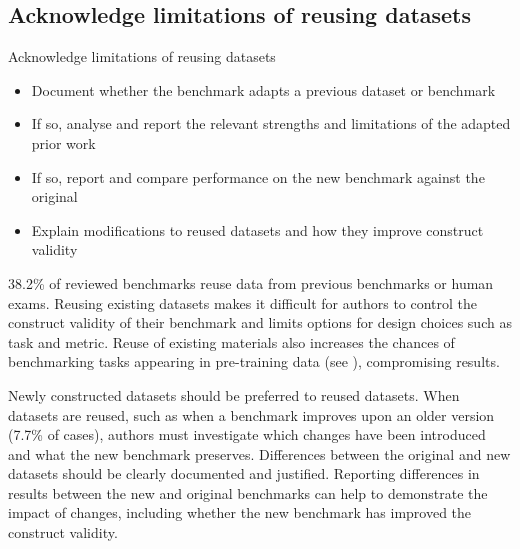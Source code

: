 \subsection{Acknowledge limitations of reusing datasets}
\begin{checklistbox}{Acknowledge limitations of reusing datasets}
    \begin{itemize}[leftmargin=5pt, label=\scriptsize$\square$]
    \item Document whether the benchmark adapts a previous dataset or benchmark
    \item If so, analyse and report the relevant strengths and limitations of the adapted prior work
    \item If so, report and compare performance on the new benchmark against the original
    \item Explain modifications to reused datasets and how they improve construct validity
\end{itemize}
\end{checklistbox}

38.2\% of reviewed benchmarks reuse data from previous benchmarks or human exams. Reusing existing datasets makes it difficult for authors to control the construct validity of their benchmark and limits options for design choices such as task and metric. Reuse of existing materials also increases the chances of benchmarking tasks appearing in pre-training data (see ), compromising results.


Newly constructed datasets should be preferred to reused datasets.
When datasets are reused, such as when a benchmark improves upon an older version (7.7\% of cases), authors must investigate which changes have been introduced and what the new benchmark preserves.
Differences between the original and new datasets should be clearly documented and justified. Reporting differences in results between the new and original benchmarks can help to demonstrate the impact of changes, including whether the new benchmark has improved the construct validity.

